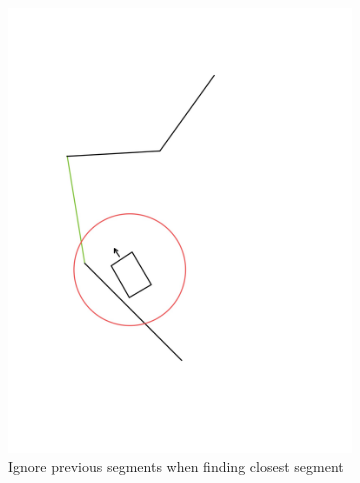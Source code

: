 \documentclass{article}
\begin{document}
\begin{figure}[h]
\begin{subfigure}[b]{0.25\textwidth}
        \includegraphics[width=\textwidth]{6.141-53.jpg}
        \caption{Ignore previous segments when finding closest segment}
    \end{subfigure}
    \hfill
    \begin{subfigure}[b]{0.25\textwidth}
        \centering

\end{subfigure}
\end{figure}
\end{document}
